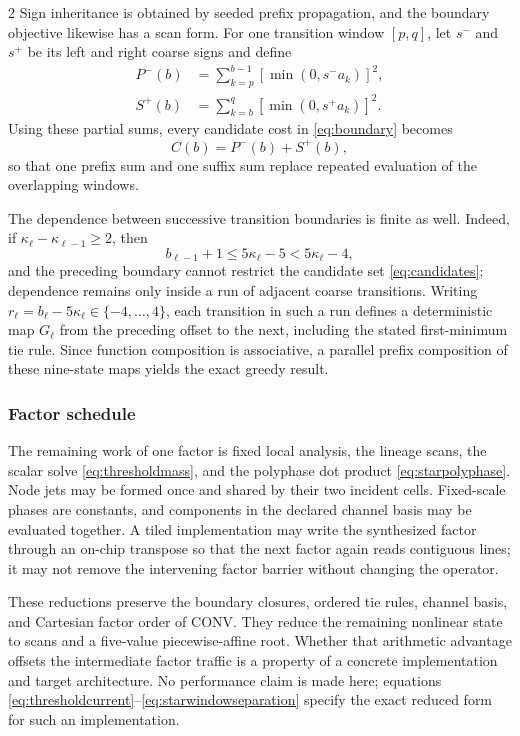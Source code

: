 \begin{multicols}{2}
Sign inheritance is obtained by seeded prefix propagation, and the boundary
objective likewise has a scan form. For one transition window
\([p,q]\), let \(s^-\) and \(s^+\) be its left and right coarse signs and
define
\begin{align}
 P^-(b)&=\sum_{k=p}^{b-1}[\min(0,s^-a_k)]^2,\nonumber\\
 S^+(b)&=\sum_{k=b}^{q}[\min(0,s^+a_k)]^2.
 \label{eq:starconflictscan}
\end{align}
Using these partial sums, every candidate cost in \eqref{eq:boundary} becomes
\begin{equation}
 C(b)=P^-(b)+S^+(b),
 \label{eq:starboundarycost}
\end{equation}
so that one prefix sum and one suffix sum replace repeated evaluation of the
overlapping windows.

The dependence between successive transition boundaries is finite as well.
Indeed, if \(\kappa_\ell-\kappa_{\ell-1}\geq2\), then
\begin{equation}
 b_{\ell-1}+1\leq5\kappa_\ell-5<5\kappa_\ell-4,
 \label{eq:starwindowseparation}
\end{equation}
and the preceding boundary cannot restrict the candidate set
\eqref{eq:candidates}; dependence remains only inside a run of adjacent
coarse transitions. Writing
\(r_\ell=b_\ell-5\kappa_\ell\in\{-4,\ldots,4\}\), each transition in such a
run defines a deterministic map \(G_\ell\) from the preceding offset to the
next, including the stated first-minimum tie rule. Since function composition
is associative, a parallel prefix composition of these nine-state maps yields
the exact greedy result.

\subsubsection{Factor schedule}

The remaining work of one factor is fixed local analysis, the lineage scans,
the scalar solve \eqref{eq:thresholdmass}, and the polyphase dot product
\eqref{eq:starpolyphase}. Node jets may be formed once and shared by their two
incident cells. Fixed-scale phases are constants, and components in the
declared channel basis may be evaluated together. A tiled implementation may
write the synthesized factor through an on-chip transpose so that the next
factor again reads contiguous lines; it may not remove the intervening factor
barrier without changing the operator.

These reductions preserve the boundary closures, ordered tie rules, channel
basis, and Cartesian factor order of CONV. They reduce the remaining
nonlinear state to scans and a five-value piecewise-affine root. Whether that
arithmetic advantage offsets the intermediate factor traffic is a property
of a concrete implementation and target architecture. No performance claim
is made here; equations \eqref{eq:thresholdcurrent}--\eqref{eq:starwindowseparation}
specify the exact reduced form for such an implementation.

\end{multicols}
\twocolumn
